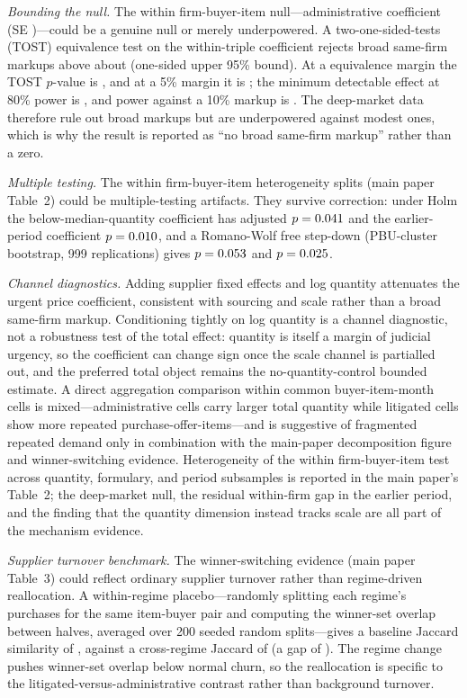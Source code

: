 \textit{Bounding the null.} The within firm-buyer-item null---administrative coefficient \BPutgTripleCoefUTG{} (SE \BPutgTripleSEUTG{})---could be a genuine null or merely underpowered. A two-one-sided-tests (TOST) equivalence test on the within-triple coefficient rejects broad same-firm markups above about \BPwfNullRuleOutPct{} (one-sided upper 95\% bound). At a \BPwfTostMarginPct{} equivalence margin the TOST $p$-value is \BPwfTostPten{}, and at a 5\% margin it is \BPwfTostPfive{}; the minimum detectable effect at 80\% power is \BPwfNullMdePct{}, and power against a 10\% markup is \BPwfNullPowerTen{}. The deep-market data therefore rule out broad markups but are underpowered against modest ones, which is why the result is reported as ``no broad same-firm markup'' rather than a zero.

\textit{Multiple testing.} The within firm-buyer-item heterogeneity splits (main paper Table~2) could be multiple-testing artifacts. They survive correction: under Holm the below-median-quantity coefficient has adjusted $p=0.041{}$ and the earlier-period coefficient $p=0.010{}$, and a Romano-Wolf free step-down (PBU-cluster bootstrap, 999 replications) gives $p=0.053{}$ and $p=0.025{}$.

\textit{Channel diagnostics.} Adding supplier fixed effects and log quantity attenuates the urgent price coefficient, consistent with sourcing and scale rather than a broad same-firm markup. Conditioning tightly on log quantity is a channel diagnostic, not a robustness test of the total effect: quantity is itself a margin of judicial urgency, so the coefficient can change sign once the scale channel is partialled out, and the preferred total object remains the no-quantity-control bounded estimate. A direct aggregation comparison within common buyer-item-month cells is mixed---administrative cells carry larger total quantity while litigated cells show more repeated purchase-offer-items---and is suggestive of fragmented repeated demand only in combination with the main-paper decomposition figure and winner-switching evidence. Heterogeneity of the within firm-buyer-item test across quantity, formulary, and period subsamples is reported in the main paper's Table~2; the deep-market null, the residual within-firm gap in the earlier period, and the finding that the quantity dimension instead tracks scale are all part of the mechanism evidence.

\textit{Supplier turnover benchmark.} The winner-switching evidence (main paper Table~3) could reflect ordinary supplier turnover rather than regime-driven reallocation. A within-regime placebo---randomly splitting each regime's purchases for the same item-buyer pair and computing the winner-set overlap between halves, averaged over 200 seeded random splits---gives a baseline Jaccard similarity of \BPwfChurnBaselineJaccard{}, against a cross-regime Jaccard of \BPwinnerSwitchJaccardMean{} (a gap of \BPwfChurnGap{}). The regime change pushes winner-set overlap below normal churn, so the reallocation is specific to the litigated-versus-administrative contrast rather than background turnover.

